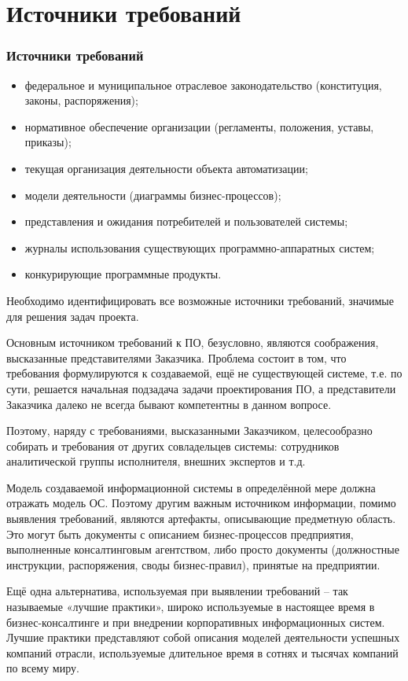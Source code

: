 \documentclass{../industrial-development}
\begin{document}
\section{Источники требований}
\begin{frame} \frametitle{Источники требований }
 \begin{itemize}
\item федеральное и муниципальное отраслевое законодательство (конституция, законы, распоряжения);
\item нормативное обеспечение организации (регламенты, положения, уставы, приказы);
\item текущая организация деятельности объекта автоматизации;
\item модели деятельности (диаграммы бизнес-процессов);
\item представления и ожидания потребителей и пользователей системы;
\item журналы использования существующих программно-аппаратных систем;
\item конкурирующие программные продукты.
  \end{itemize}
Необходимо идентифицировать \alert{все возможные источники требований}, значимые для решения задач проекта. 
\end{frame}

\lecturenotes

Основным источником требований к ПО, безусловно, являются соображения, высказанные представителями Заказчика. Проблема состоит в том, что требования формулируются к создаваемой, ещё не существующей системе, т.е. по сути, решается начальная подзадача задачи проектирования ПО, а представители Заказчика далеко не всегда бывают компетентны в данном вопросе. 

Поэтому, наряду с требованиями, высказанными Заказчиком, целесообразно собирать и требования от других совладельцев системы: сотрудников аналитической группы исполнителя, внешних экспертов и т.д.

Модель создаваемой информационной системы в определённой мере должна отражать модель ОС. Поэтому другим важным источником информации, помимо выявления требований, являются артефакты, описывающие предметную область. Это могут быть документы с описанием бизнес-процессов предприятия, выполненные консалтинговым агентством, либо просто документы (должностные инструкции, распоряжения, своды бизнес-правил), принятые на предприятии.

Ещё одна альтернатива, используемая при выявлении требований – так называемые «лучшие практики», широко используемые в настоящее время в бизнес-консалтинге и при внедрении корпоративных информационных систем. Лучшие практики представляют собой описания моделей деятельности успешных компаний отрасли, используемые длительное время в сотнях и тысячах компаний по всему миру.
\end{document}
